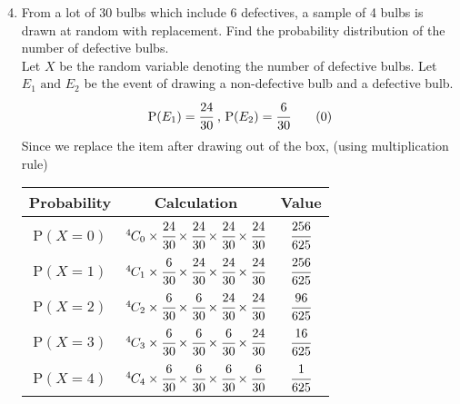 \documentclass[journal,12pt,twocolumn]{IEEEtran}
\begin{document}
\begin{enumerate}[label=13.\arabic{enumi}.\arabic{enumii}]

\setcounter{enumi}{3}
\setcounter{enumii}{6}
\item From a lot of 30 bulbs which include 6 defectives, a sample of 4 bulbs is drawn at random with replacement. Find the probability distribution of the number of defective bulbs.\\
	\solution
		Let $X$ be the random variable denoting the number of defective bulbs. Let $E_1 \text{ and } E_2$ be the event of drawing a non-defective bulb and a defective bulb.
		\[ \text{P}(E_1)=\cfrac{24}{30} \text{ , } \text{P}(E_2)=\cfrac{6}{30} \numberthis\]
		Since we replace the item after drawing out of the box, (using multiplication rule)
	\begin{table}[h]
	\small
	\centering
		\begin{tabular}[20pt]{|c|c|c|} \hline
			\T \B \textbf{Probability}&\textbf{Calculation}&\textbf{Value}\\ \hline
			P$(X=0)$ \T \B &${{}^{4}\mkern-1muC_{0}} \times \cfrac{24}{30}\times \cfrac{24}{30}\times \cfrac{24}{30}\times \cfrac{24}{30}$ &$\cfrac{256}{625}$ \\[1.5ex] \hline
			P$(X=1)$ \T \B &${{}^{4}\mkern-1muC_{1}} \times \cfrac{6}{30}\times \cfrac{24}{30}\times \cfrac{24}{30}\times \cfrac{24}{30}$  &$\cfrac{256}{625}$ \\[1.5ex] \hline
			P$(X=2)$ \T \B &${{}^{4}\mkern-1muC_{2}} \times \cfrac{6}{30}\times \cfrac{6}{30}\times \cfrac{24}{30}\times \cfrac{24}{30}$   &$\cfrac{96}{625}$  \\[1.5ex] \hline
			P$(X=3)$ \T \B &${{}^{4}\mkern-1muC_{3}} \times \cfrac{6}{30}\times \cfrac{6}{30}\times \cfrac{6}{30}\times \cfrac{24}{30}$    &$\cfrac{16}{625}$  \\[1.5ex] \hline
			P$(X=4)$ \T \B &${{}^{4}\mkern-1muC_{4}} \times \cfrac{6}{30}\times \cfrac{6}{30}\times \cfrac{6}{30}\times \cfrac{6}{30}$     &$\cfrac{1}{625}$   \\[1.5ex] \hline
		\end{tabular}
	\end{table} 
	\begin{table}[h!]
	\normalsize
	\centering

\end{table}
\end{enumerate}
\end{document}
